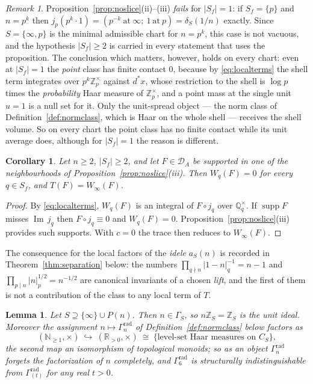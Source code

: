 \documentclass[11pt]{amsart}
\newtheorem{lemma}[theorem]{Lemma}
\newtheorem{corollary}[theorem]{Corollary}
\theoremstyle{definition}
\theoremstyle{remark}
\newtheorem{remark}[theorem]{Remark}
\newcommand{\R}{\mathbb R}
\newcommand{\N}{\mathbb N}
\newcommand{\Z}{\mathbb Z}
\newcommand{\Q}{\mathbb Q}
\newcommand{\Iml}{\operatorname{Im}}
\newcommand{\supp}{\operatorname{supp}}
\newcommand{\DA}{\mathcal D_A}
\begin{document}
\begin{remark}\label{rem:minimalchart}
Proposition~\ref{prop:noslice}(ii)--(iii) \emph{fails} for $|S_f|=1$: if
$S_f=\{p\}$ and $n=p^k$ then $j_p(p^k\cdot1)=(p^{-k}\ \text{at}\ \infty;\
1\ \text{at}\ p)=\delta_S(1/n)$ exactly. Since $S=\{\infty,p\}$ is the minimal
admissible chart for $n=p^k$, this case is not vacuous, and the hypothesis
$|S_f|\ge2$ is carried in every statement that uses the proposition. The
conclusion which matters, however, holds on every chart: even at $|S_f|=1$ the
\emph{point} class has finite contact $0$, because by \eqref{eq:localterms} the
shell term integrates over $p^k\Z_p^\times$ against $d^*x$, whose restriction
to the shell is $\log p$ times the \emph{probability} Haar measure of
$\Z_p^\times$, and a point mass at the single unit $u=1$ is a null set for it.
Only the unit-spread object --- the norm class of
Definition~\ref{def:normclass}, which is Haar on the whole shell --- receives
the shell volume. So on every chart the point class has no finite contact while its unit
average does, although for $|S_f|=1$ the reason is different.
\end{remark}

\begin{corollary}\label{cor:liftnotcontact}
Let $n\ge2$, $|S_f|\ge2$, and let $F\in\DA$ be supported in one of the
neighbourhoods of Proposition~\ref{prop:noslice}(iii). Then $W_q(F)=0$ for
every $q\in S_f$, and $T(F)=W_\infty(F)$.
\end{corollary}

\begin{proof}
By \eqref{eq:localterms}, $W_q(F)$ is an integral of $F\circ j_q$ over
$\Q_q^\times$. If $\supp F$ misses $\Iml\,j_q$ then $F\circ j_q\equiv0$ and
$W_q(F)=0$. Proposition~\ref{prop:noslice}(iii) provides such supports. With
$c=0$ the trace then reduces to $W_\infty(F)$.
\end{proof}

The consequence for the local factors of the \emph{idele} $a_S(n)$ is recorded
in Theorem~\ref{thm:separation} below: the numbers $\prod_{q\nmid n}
|1-n|_q^{-1}=n-1$ and $\prod_{p\mid n}|n|_p^{1/2}=n^{-1/2}$ are canonical
invariants of a chosen \emph{lift}, and the first of them is not a contribution
of the class to any local term of $T$.

\begin{lemma}\label{lem:notideal}
Let $S\supseteq\{\infty\}\cup P(n)$. Then $n\in\Gamma_S$, so $n\Z_S=\Z_S$ is
the unit ideal. Moreover the assignment $n\mapsto\Gamma_n^{\mathrm{rad}}$ of
Definition~\ref{def:normclass} below factors as
\begin{equation}\label{eq:factorsthrough}
  (\N_{\ge1},\times)\ \hookrightarrow\ (\R_{>0},\times)\ \cong\
  \{\text{level-set Haar measures on }C_S\},
\end{equation}
the second map an isomorphism of topological monoids; so as an \emph{object}
$\Gamma_n^{\mathrm{rad}}$ forgets the factorization of $n$ completely, and
$\Gamma_6^{\mathrm{rad}}$ is structurally indistinguishable from
$\Gamma^{\mathrm{rad}}_{(t)}$ for any real $t>0$.
\end{lemma}
\end{document}
